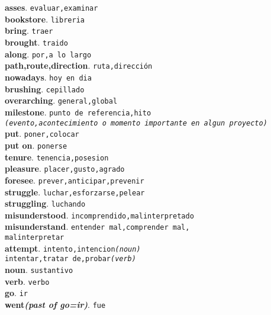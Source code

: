 \documentclass[twocolumn]{article}
\begin{document}
	\textsf{\textbf{asses}}. \texttt{evaluar,examinar}\\
	\textsf{\textbf{bookstore}}. \texttt{libreria}\\
	\textsf{\textbf{bring}}. \texttt{traer}\\
	\textsf{\textbf{brought}}. \texttt{traido}\\
	\textsf{\textbf{along}}. \texttt{por,a lo largo}\\
	\textsf{\textbf{path,route,direction}}. \texttt{ruta,direcci\'on}\\
	\textsf{\textbf{nowadays}}. \texttt{hoy en dia}\\
	\textsf{\textbf{brushing}}. \texttt{cepillado}\\
	\textsf{\textbf{overarching}}. \texttt{general,global}\\
	\textsf{\textbf{milestone}}. \texttt{punto de referencia,hito\\{\scriptsize \textsl{(evento,acontecimiento o momento importante en algun proyecto)}}}\\
	\textsf{\textbf{put}}. \texttt{poner,colocar}\\
	\textsf{\textbf{put on}}. \texttt{ponerse}\\
	\textsf{\textbf{tenure}}. \texttt{tenencia,posesion}\\
	\textsf{\textbf{pleasure}}. \texttt{placer,gusto,agrado}\\
	\textsf{\textbf{foresee}}. \texttt{prever,anticipar,prevenir}\\
	\textsf{\textbf{struggle}}. \texttt{luchar,esforzarse,pelear}\\
	\textsf{\textbf{struggling}}. \texttt{luchando}\\
	\textsf{\textbf{misunderstood}}. \texttt{incomprendido,malinterpretado}\\
	\textsf{\textbf{misunderstand}}. \texttt{entender mal,comprender mal,\\malinterpretar}\\
	\textsf{\textbf{attempt}}. \texttt{intento,intencion{\scriptsize \textsl{(noun)}}\\intentar,tratar de,probar{\scriptsize \textsl{(verb)}}}\\
	\textsf{\textbf{noun}}. \texttt{sustantivo}\\
	\textsf{\textbf{verb}}. \texttt{verbo}\\
	\textsf{\textbf{go}}. \texttt{ir}\\
	\textsf{\textbf{went{\scriptsize \textsl{(past of go=ir)}}}}. \texttt{fue}\\
\end{document}
